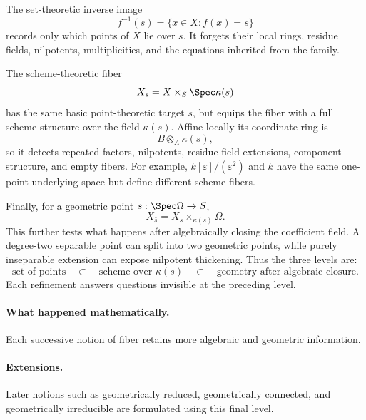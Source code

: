 \begin{solution}
The set-theoretic inverse image
\[
f^{-1}(s)=\{x\in X:f(x)=s\}
\]
records only which points of \(X\) lie over \(s\).  It forgets their local rings, residue fields, nilpotents, multiplicities, and the equations inherited from the family.

The scheme-theoretic fiber
\[
X_s=X\times_S\Spec\kappa(s)
\]
has the same basic point-theoretic target \(s\), but equips the fiber with a full scheme structure over the field \(\kappa(s)\).  Affine-locally its coordinate ring is
\[
B\otimes_A\kappa(s),
\]
so it detects repeated factors, nilpotents, residue-field extensions, component structure, and empty fibers.  For example, \(k[\varepsilon]/(\varepsilon^2)\) and \(k\) have the same one-point underlying space but define different scheme fibers.

Finally, for a geometric point \(\bar s:\Spec\Omega\to S\),
\[
X_{\bar s}=X_s\times_{\kappa(s)}\Omega.
\]
This further tests what happens after algebraically closing the coefficient field.  A degree-two separable point can split into two geometric points, while purely inseparable extension can expose nilpotent thickening.  Thus the three levels are:
\[
\text{set of points}
\quad\subset\quad
\text{scheme over }\kappa(s)
\quad\subset\quad
\text{geometry after algebraic closure}.
\]
Each refinement answers questions invisible at the preceding level.
\end{solution}

\paragraph{What happened mathematically.}
Each successive notion of fiber retains more algebraic and geometric information.

\paragraph{Extensions.}
Later notions such as geometrically reduced, geometrically connected, and geometrically irreducible are formulated using this final level.
\fi
